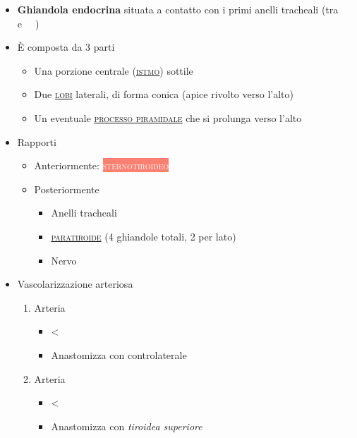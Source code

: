 \documentclass[italian,]{article}
\providecommand{\tightlist}{%
  \setlength{\itemsep}{0pt}\setlength{\parskip}{0pt}}
\newcommand{\mus}[1]{\colorbox{Salmon}{\textcolor{white}{\textsc{#1}}}}
\newcommand{\oss}[1]{\colorbox{ossa}{\textcolor{white}{\textsc{#1}}}}
\newcommand{\art}[1]{\colorbox{RedOrange}{\textcolor{white}{\textsc{#1}}}}
\newcommand{\ner}[1]{\colorbox{Dandelion}{\textcolor{white}{\textsc{#1}}}}
\renewcommand{\a}[1]{\underline{\textsc{#1}}}
\begin{document}
\begin{itemize}
\tightlist
\item
  \textbf{Ghiandola endocrina} situata a contatto con i primi anelli
  tracheali (tra \oss{c5} e \oss{t1})
\item
  È composta da 3 parti

  \begin{itemize}
  \tightlist
  \item
    Una porzione centrale (\a{istmo}) sottile
  \item
    Due \a{lobi} laterali, di forma conica (apice rivolto verso l'alto)
  \item
    Un eventuale \a{processo piramidale} che si prolunga verso l'alto
  \end{itemize}
\item
  Rapporti

  \begin{itemize}
  \tightlist
  \item
    Anteriormente: \mus{sternotiroideo}
  \item
    Posteriormente

    \begin{itemize}
    \tightlist
    \item
      Anelli tracheali
    \item
      \a{paratiroide} (4 ghiandole totali, 2 per lato)
    \item
      Nervo \ner{laringeo ricorrente}
    \end{itemize}
  \end{itemize}
\item
  Vascolarizzazione arteriosa

  \begin{enumerate}
  \def\labelenumi{\arabic{enumi}.}
  \tightlist
  \item
    Arteria \art{tiroidea superiore}

    \begin{itemize}
    \tightlist
    \item
      \textless{} \art{carotide esterna}
    \item
      Anastomizza con controlaterale
    \end{itemize}
  \item
    Arteria \art{tiroidea inferiore}

    \begin{itemize}
    \tightlist
    \item
      \textless{} \art{tronco tireocervicale}
    \item
      Anastomizza con \emph{tiroidea superiore}
    \end{itemize}
  \end{enumerate}


\end{itemize}
\end{document}

